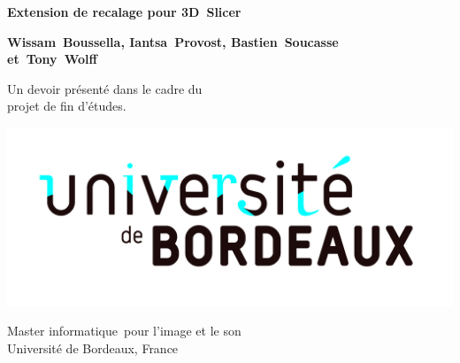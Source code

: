 \documentclass{article}
\begin{document}
{
    \begin{titlepage}
        \begin{center}
            \vspace*{2.54cm}

            \Large \textbf{Extension de recalage pour 3D~Slicer}

            \vspace{2.54cm}

            \large \textbf{Wissam~Boussella, Iantsa~Provost, Bastien~Soucasse \\ et~Tony~Wolff}

            \vfill

            Un devoir présenté dans le cadre du \\ projet de fin d'études.

            \vspace{2.54cm}

            \includegraphics[width=.5\textwidth]{images/ub.jpg}

            Master informatique pour l'image et le son \\ Université de Bordeaux, France
        \end{center}
    \end{titlepage}
    \newpage
    \setcounter{page}{2}
}

{
    \hypersetup{linkcolor=black}
    \tableofcontents
    \newpage
}
\end{document}
